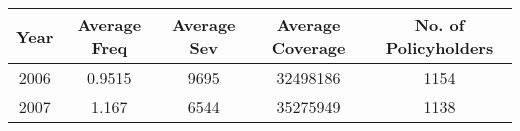 \documentclass[]{book}
\theoremstyle{definition}
\theoremstyle{definition}
\theoremstyle{definition}
\theoremstyle{remark}
\begin{document}
\begin{longtable}[]{@{}ccccc@{}}
\toprule
\begin{minipage}[b]{0.08\columnwidth}\centering\strut
Year\strut
\end{minipage} & \begin{minipage}[b]{0.17\columnwidth}\centering\strut
Average Freq\strut
\end{minipage} & \begin{minipage}[b]{0.16\columnwidth}\centering\strut
Average Sev\strut
\end{minipage} & \begin{minipage}[b]{0.21\columnwidth}\centering\strut
Average Coverage\strut
\end{minipage} & \begin{minipage}[b]{0.25\columnwidth}\centering\strut
No. of Policyholders\strut
\end{minipage}\tabularnewline
\midrule
\endhead
\begin{minipage}[t]{0.08\columnwidth}\centering\strut
2006\strut
\end{minipage} & \begin{minipage}[t]{0.17\columnwidth}\centering\strut
0.9515\strut
\end{minipage} & \begin{minipage}[t]{0.16\columnwidth}\centering\strut
9695\strut
\end{minipage} & \begin{minipage}[t]{0.21\columnwidth}\centering\strut
32498186\strut
\end{minipage} & \begin{minipage}[t]{0.25\columnwidth}\centering\strut
1154\strut
\end{minipage}\tabularnewline
\begin{minipage}[t]{0.08\columnwidth}\centering\strut
2007\strut
\end{minipage} & \begin{minipage}[t]{0.17\columnwidth}\centering\strut
1.167\strut
\end{minipage} & \begin{minipage}[t]{0.16\columnwidth}\centering\strut
6544\strut
\end{minipage} & \begin{minipage}[t]{0.21\columnwidth}\centering\strut
35275949\strut
\end{minipage} & \begin{minipage}[t]{0.25\columnwidth}\centering\strut
1138\strut
\end{minipage}\tabularnewline

\end{longtable}
\end{document}
